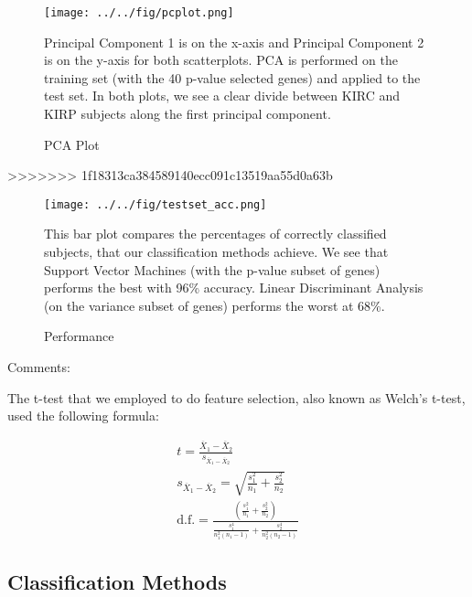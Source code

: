 \begin{figure}[H]
  \centering
    \texttt{[image: ../../fig/pcplot.png]}
\caption{PCA Plot} Principal Component 1 is on the x-axis and Principal Component 2 is on the y-axis for both scatterplots.
			    PCA is performed on the training set (with the 40 p-value selected genes) and applied to the test set. In both plots, we see a clear divide between 	KIRC and KIRP subjects along the first principal component. 
   \label{fig:pca}
\end{figure}

>>>>>>> 1f18313ca384589140ecc091c13519aa55d0a63b


\begin{figure}[H]
  \centering
    \texttt{[image: ../../fig/testset\_acc.png]}
\caption{Performance }This bar plot compares the percentages of correctly classified subjects, that our classification methods achieve. We see that Support Vector Machines (with the p-value subset of genes) performs the best with 96\% accuracy. Linear
Discriminant Analysis (on the variance subset of genes) performs the worst at 68\%. 
   \label{fig:performance}
\end{figure}



Comments:

The t-test that we employed to do feature selection, also known as Welch's
t-test, used the following formula:

\begin{gather}
t = \frac{\overline{X}_1-\overline{X}_2}{s_{\overline{X}_1-\overline{X}_2}} \\
s_{\overline{X}_1-\overline{X}_2} = \sqrt{\frac{s_1^2}{n_1}+\frac{s_2^2}{n_2}} \\
\text{d.f.} = \frac{\left(\frac{s_1^2}{n_1}+\frac{s_2^2}{n_2} \right)}{\frac{s_1^4}{n_1^2(n_1-1)} + \frac{s_2^4}{n_2^2(n_2-1)}}
\end{gather}

\subsection{Classification Methods}


